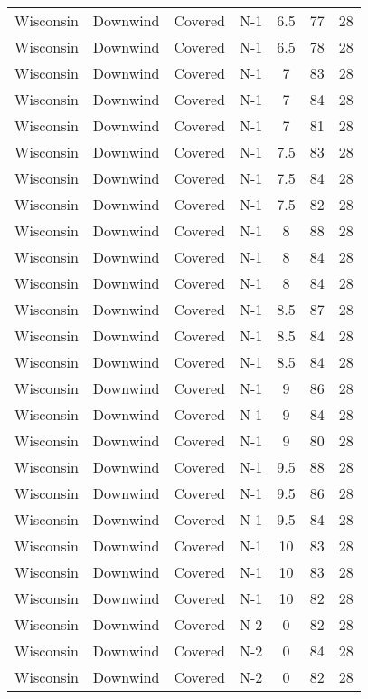 \documentclass{article}
\begin{document}
\begin{longtable}[H]{ccccccc}
Wisconsin & Downwind & Covered     & N-1 & 6.5  & 77  & 28 \\
Wisconsin & Downwind & Covered     & N-1 & 6.5  & 78  & 28 \\
Wisconsin & Downwind & Covered     & N-1 & 7    & 83  & 28 \\
Wisconsin & Downwind & Covered     & N-1 & 7    & 84  & 28 \\
Wisconsin & Downwind & Covered     & N-1 & 7    & 81  & 28 \\
Wisconsin & Downwind & Covered     & N-1 & 7.5  & 83  & 28 \\
Wisconsin & Downwind & Covered     & N-1 & 7.5  & 84  & 28 \\
Wisconsin & Downwind & Covered     & N-1 & 7.5  & 82  & 28 \\
Wisconsin & Downwind & Covered     & N-1 & 8    & 88  & 28 \\
Wisconsin & Downwind & Covered     & N-1 & 8    & 84  & 28 \\
Wisconsin & Downwind & Covered     & N-1 & 8    & 84  & 28 \\
Wisconsin & Downwind & Covered     & N-1 & 8.5  & 87  & 28 \\
Wisconsin & Downwind & Covered     & N-1 & 8.5  & 84  & 28 \\
Wisconsin & Downwind & Covered     & N-1 & 8.5  & 84  & 28 \\
Wisconsin & Downwind & Covered     & N-1 & 9    & 86  & 28 \\
Wisconsin & Downwind & Covered     & N-1 & 9    & 84  & 28 \\
Wisconsin & Downwind & Covered     & N-1 & 9    & 80  & 28 \\
Wisconsin & Downwind & Covered     & N-1 & 9.5  & 88  & 28 \\
Wisconsin & Downwind & Covered     & N-1 & 9.5  & 86  & 28 \\
Wisconsin & Downwind & Covered     & N-1 & 9.5  & 84  & 28 \\
Wisconsin & Downwind & Covered     & N-1 & 10   & 83  & 28 \\
Wisconsin & Downwind & Covered     & N-1 & 10   & 83  & 28 \\
Wisconsin & Downwind & Covered     & N-1 & 10   & 82  & 28 \\
Wisconsin & Downwind & Covered     & N-2 & 0    & 82  & 28 \\
Wisconsin & Downwind & Covered     & N-2 & 0    & 84  & 28 \\
Wisconsin & Downwind & Covered     & N-2 & 0    & 82  & 28 \\

\end{longtable}
\end{document}
